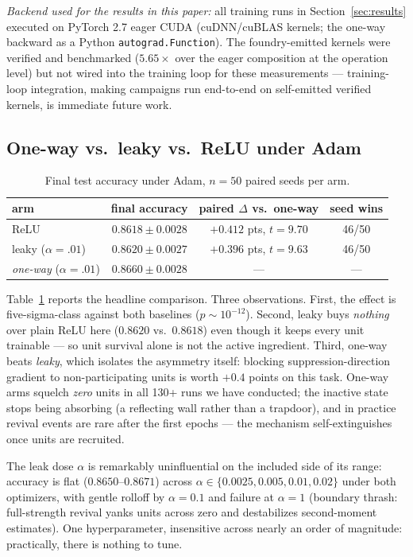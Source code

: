 \documentclass[11pt]{article}
\begin{document}
\emph{Backend used for the results in this paper:} all training runs
in Section~\ref{sec:results} executed on PyTorch 2.7 eager CUDA
(cuDNN/cuBLAS kernels; the one-way backward as a Python
\texttt{autograd.Function}). The foundry-emitted kernels were
verified and benchmarked ($5.65\times$ over the eager composition at
the operation level) but not wired into the training loop for these
measurements --- training-loop integration, making campaigns run
end-to-end on self-emitted verified kernels, is immediate future
work.

\subsection{One-way vs.\ leaky vs.\ ReLU under Adam}

\begin{table}[h]
\centering
\caption{Final test accuracy under Adam, $n{=}50$ paired seeds per arm.}
\label{tab:adam}
\begin{tabular}{lccc}
\toprule
arm & final accuracy & paired $\Delta$ vs.\ one-way & seed wins \\
\midrule
ReLU        & $0.8618 \pm 0.0028$ & $+0.412$ pts, $t = 9.70$ & 46/50 \\
leaky ($\alpha{=}.01$) & $0.8620 \pm 0.0027$ & $+0.396$ pts, $t = 9.63$ & 46/50 \\
\emph{one-way} ($\alpha{=}.01$) & $\mathbf{0.8660 \pm 0.0028}$ & --- & --- \\
\bottomrule
\end{tabular}
\end{table}

Table~\ref{tab:adam} reports the headline comparison. Three observations. First, the effect is five-sigma-class against both
baselines ($p \sim 10^{-12}$). Second, leaky buys \emph{nothing} over
plain ReLU here ($0.8620$ vs.\ $0.8618$) even though it keeps every unit
trainable --- so unit survival alone is not the active ingredient.
Third, one-way beats \emph{leaky}, which isolates the asymmetry itself:
blocking suppression-direction gradient to non-participating units is
worth $+0.4$ points on this task. One-way arms squelch \emph{zero} units
in all 130+ runs we have conducted; the inactive state stops being
absorbing (a reflecting wall rather than a trapdoor), and in practice
revival events are rare after the first epochs --- the mechanism
self-extinguishes once units are recruited.

The leak dose $\alpha$ is remarkably uninfluential on the included side
of its range: accuracy is flat ($0.8650$--$0.8671$) across
$\alpha \in \{0.0025, 0.005, 0.01, 0.02\}$ under both optimizers, with
gentle rolloff by $\alpha{=}0.1$ and failure at $\alpha{=}1$ (boundary
thrash: full-strength revival yanks units across zero and destabilizes
second-moment estimates). One hyperparameter, insensitive across nearly
an order of magnitude: practically, there is nothing to tune.
\end{document}
